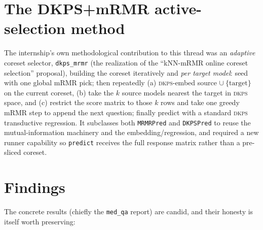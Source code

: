 \documentclass[11pt]{report}
\newcommand{\code}[1]{\texttt{#1}}
\begin{document}
\section{The DKPS+mRMR active-selection method}

The internship's own methodological contribution to this thread was an
\emph{adaptive} coreset selector, \code{dkps\_mrmr} (the realization of the
``kNN-mRMR online coreset selection'' proposal), building the coreset iteratively
and \emph{per target model}: seed with one global mRMR pick; then repeatedly
(a) \textsc{dkps}-embed source $\cup\ \{\text{target}\}$ on the current coreset,
(b) take the $k$ source models nearest the target in \textsc{dkps} space, and
(c) restrict the score matrix to those $k$ rows and take one greedy mRMR step to
append the next question; finally predict with a standard \textsc{dkps} transductive
regression. It subclasses both \code{MRMRPred} and \code{DKPSPred} to reuse the
mutual-information machinery and the embedding/regression, and required a new runner
capability so \code{predict} receives the full response matrix rather than a
pre-sliced coreset.

\section{Findings}

The concrete results (chiefly the \code{med\_qa} report) are candid, and their
honesty is itself worth preserving:
\end{document}
